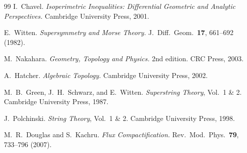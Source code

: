 \documentclass[11pt,a4paper]{article}
\theoremstyle{plain}
\theoremstyle{definition}
\begin{document}
\begin{thebibliography}{99}
I.\ Chavel.
\textit{Isoperimetric Inequalities: Differential Geometric and Analytic 
Perspectives.}
Cambridge University Press, 2001.

E.\ Witten.
\textit{Supersymmetry and Morse Theory.}
J.\ Diff.\ Geom.\ \textbf{17}, 661--692 (1982).

M.\ Nakahara.
\textit{Geometry, Topology and Physics.}
2nd edition. CRC Press, 2003.

A.\ Hatcher.
\textit{Algebraic Topology.}
Cambridge University Press, 2002.

M.\ B.\ Green, J.\ H.\ Schwarz, and E.\ Witten.
\textit{Superstring Theory}, Vol.\ 1 \& 2.
Cambridge University Press, 1987.

J.\ Polchinski.
\textit{String Theory}, Vol.\ 1 \& 2.
Cambridge University Press, 1998.

M.\ R.\ Douglas and S.\ Kachru.
\textit{Flux Compactification.}
Rev.\ Mod.\ Phys.\ \textbf{79}, 733--796 (2007).

\end{thebibliography}

\end{document}
